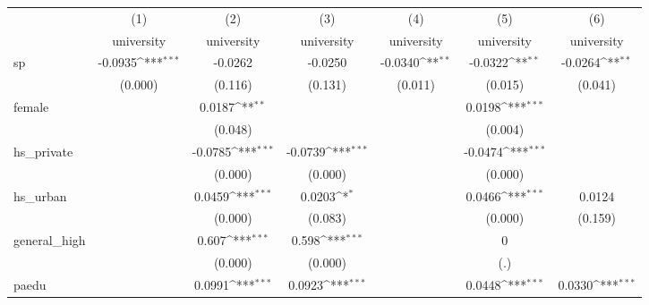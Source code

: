 {
\def\sym#1{\ifmmode^{#1}\else\(^{#1}\)\fi}
\begin{tabular}{l*{6}{c}}
\hline\hline
            &\multicolumn{1}{c}{(1)}&\multicolumn{1}{c}{(2)}&\multicolumn{1}{c}{(3)}&\multicolumn{1}{c}{(4)}&\multicolumn{1}{c}{(5)}&\multicolumn{1}{c}{(6)}\\
            &\multicolumn{1}{c}{university}&\multicolumn{1}{c}{university}&\multicolumn{1}{c}{university}&\multicolumn{1}{c}{university}&\multicolumn{1}{c}{university}&\multicolumn{1}{c}{university}\\
\hline
sp          &     -0.0935\sym{***}&     -0.0262         &     -0.0250         &     -0.0340\sym{**} &     -0.0322\sym{**} &     -0.0264\sym{**} \\
            &     (0.000)         &     (0.116)         &     (0.131)         &     (0.011)         &     (0.015)         &     (0.041)         \\
[1em]
female      &                     &      0.0187\sym{**} &                     &                     &      0.0198\sym{***}&                     \\
            &                     &     (0.048)         &                     &                     &     (0.004)         &                     \\
[1em]
hs\_private  &                     &     -0.0785\sym{***}&     -0.0739\sym{***}&                     &     -0.0474\sym{***}&                     \\
            &                     &     (0.000)         &     (0.000)         &                     &     (0.000)         &                     \\
[1em]
hs\_urban    &                     &      0.0459\sym{***}&      0.0203\sym{*}  &                     &      0.0466\sym{***}&      0.0124         \\
            &                     &     (0.000)         &     (0.083)         &                     &     (0.000)         &     (0.159)         \\
[1em]
general\_high&                     &       0.607\sym{***}&       0.598\sym{***}&                     &           0         &                     \\
            &                     &     (0.000)         &     (0.000)         &                     &         (.)         &                     \\
[1em]
paedu       &                     &      0.0991\sym{***}&      0.0923\sym{***}&                     &      0.0448\sym{***}&      0.0330\sym{***}\\

\end{tabular}}
